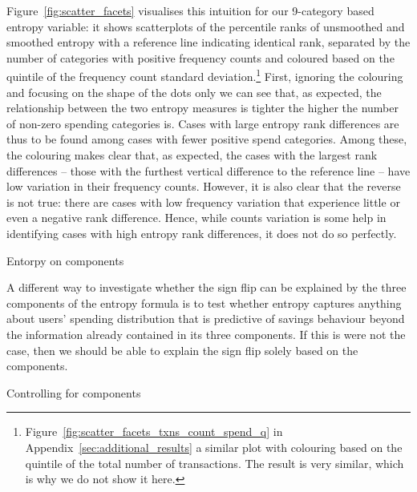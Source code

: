 Figure~\ref{fig:scatter_facets} visualises this intuition for our 9-category
based entropy variable: it shows scatterplots of the percentile ranks of
unsmoothed and smoothed entropy with a reference line indicating identical
rank, separated by the number of categories with positive frequency counts and
coloured based on the quintile of the frequency count standard
deviation.\footnote{Figure~\ref{fig:scatter_facets_txns_count_spend_q} in
    Appendix~\ref{sec:additional_results} a similar plot with colouring based on the
quintile of the total number of transactions. The result is very similar, which
is why we do not show it here.} First, ignoring the colouring and focusing on
the shape of the dots only we can see that, as expected, the relationship
between the two entropy measures is tighter the higher the number of non-zero
spending categories is. Cases with large entropy rank differences are thus to
be found among cases with fewer positive spend categories. Among these, the
colouring makes clear that, as expected, the cases with the largest rank
differences -- those with the furthest vertical difference to the reference
line -- have low variation in their frequency counts. However, it is also clear
that the reverse is not true: there are cases with low frequency variation that
experience little or even a negative rank difference. Hence, while counts
variation is some help in identifying cases with high entropy rank differences,
it does not do so perfectly.

\begin{table}[ht]
\centering\tiny
\caption{Entorpy on components}
\label{tab:entropy_on_components}

\end{table}

A different way to investigate whether the sign flip can be explained by the
three components of the entropy formula is to test whether entropy captures
anything about users' spending distribution that is predictive of savings
behaviour beyond the information already contained in its three components. If
this is were not the case, then we should be able to explain the sign flip
solely based on the components.

\begin{landscape}
\begin{table}[ht]
\centering\footnotesize
\caption{Controlling for components}
\label{tab:components}

\end{table}
\end{landscape}


